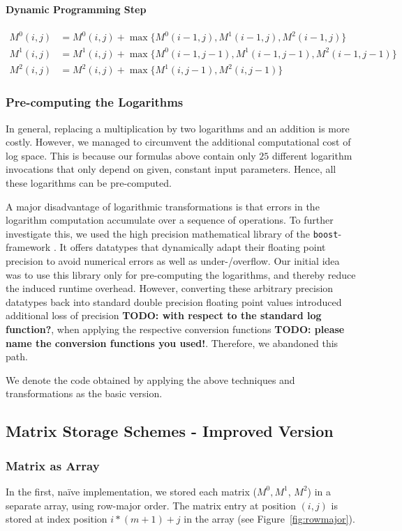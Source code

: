 \documentclass[runningheads,a4paper]{llncs}
\begin{document}
\paragraph{Dynamic Programming Step}
\begin{align*}
M^0(i,j) &= M^0(i,j) + \max\{M^0(i-1,j), M^1(i-1,j), M^2(i-1,j)\} \\
M^1(i,j) &= M^1(i,j) + \max\{M^0(i-1,j-1), M^1(i-1,j-1), M^2(i-1,j-1)\} \\
M^2(i,j) &= M^2(i,j) + \max\{M^1(i,j-1), M^2(i,j-1)\}
\end{align*}

\subsubsection{Pre-computing the Logarithms}
In general, replacing a multiplication by two logarithms and an addition is more costly. 
However, we managed to circumvent the additional computational cost of log space. 
This is because our formulas above contain only $25$ different logarithm invocations that only depend on given, constant input parameters.
Hence, all these logarithms can be pre-computed.

A major disadvantage of logarithmic transformations is that errors in the logarithm computation accumulate over a sequence of operations. 
To further investigate this, we used the high precision mathematical library of the \texttt{boost}-framework \cite{boost}. 
It offers datatypes that dynamically adapt their floating point precision to avoid numerical errors as well as under-/overflow. 
Our initial idea was to use this library only for pre-computing the logarithms, and thereby reduce the induced runtime overhead. 
However, converting these arbitrary precision datatypes back into standard double precision floating point values 
introduced additional loss of precision {\bf TODO: with respect to the standard log function?}, 
when applying the respective conversion functions {\bf TODO: please name the conversion functions you used!}.
Therefore, we abandoned this path.

We denote the code obtained by applying the above techniques and transformations as the basic version.

\subsection{Matrix Storage Schemes - Improved Version}
\label{sec:caching}

\subsubsection{Matrix as Array}
In the first, na\"ive implementation, we stored each matrix ($M^0, M^1$, $M^2$) in a separate array, using row-major order. 
The matrix entry at position $(i,j)$ is stored at index position $i*(m+1)+j$ in the array (see Figure~\ref{fig:rowmajor}).
\end{document}
